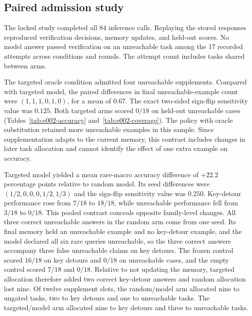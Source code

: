 \documentclass[11pt]{article}
\begin{document}
\subsection{Paired admission study}

The locked study completed all 84 inference calls. Replaying the
stored responses reproduced verification decisions, memory updates,
and held-out scores. No model answer passed verification on an
unreachable task among the 17 recorded attempts across conditions
and rounds. The attempt count includes tasks shared between arms.

The targeted oracle condition admitted four unreachable supplements.
Compared with targeted model, the paired differences in final
unreachable-example count were $(1,1,1,0,1,0)$, for a mean of $0.67$.
The exact two-sided sign-flip sensitivity value was $0.125$. Both
targeted arms scored $0/18$ on held-out unreachable cases
(Tables~\ref{tab:e002-accuracy} and~\ref{tab:e002-coverage}).
The policy with oracle substitution retained more unreachable
examples in this sample. Since supplementation adapts to the
current memory, this contrast includes changes in later task
allocation and cannot identify the effect of one extra example
on accuracy.

Targeted model yielded a mean rare-macro accuracy difference of
$+22.2$ percentage points relative to random model. Its seed
differences were $(1/2,0,0,0,1/2,1/3)$ and the sign-flip sensitivity
value was $0.250$. Key-detour performance rose from $7/18$ to
$18/18$, while unreachable performance fell from $3/18$ to $0/18$.
This pooled contrast conceals opposite family-level changes. All three
correct unreachable answers in the random arm come from one seed. Its
final memory held an unreachable example and no key-detour example,
and the model declared all six rare queries unreachable, so the three
correct answers accompany three false unreachable claims on key
detours. The frozen control scored $16/18$ on key detours and $0/18$
on unreachable cases, and the empty control scored $7/18$ and $0/18$.
Relative to not updating the memory, targeted allocation therefore
added two correct key-detour answers and random allocation lost nine. Of
twelve supplement slots, the random/model
arm allocated nine to ungated tasks, two to key detours and one to
unreachable tasks. The targeted/model arm allocated nine to key
detours and three to unreachable tasks.


\end{document}
